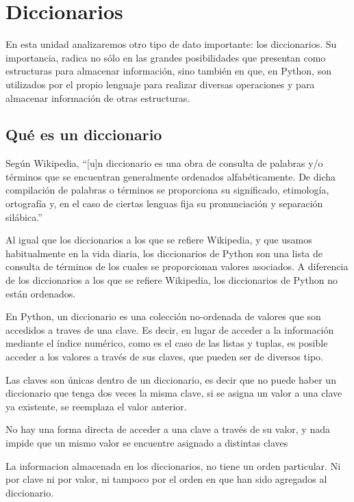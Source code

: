 \chapter{Diccionarios}

En esta unidad analizaremos otro tipo de dato importante: los diccionarios.
Su importancia, radica no sólo en las grandes posibilidades que presentan
como estructuras para almacenar información, sino también en que, en
Python, son utilizados por el propio lenguaje para realizar diversas
operaciones y para almacenar información de otras estructuras.

\section{Qué es un diccionario}

Según Wikipedia, ``[u]n diccionario es una obra de consulta de
palabras y/o términos que se encuentran generalmente ordenados
alfabéticamente. De dicha compilación de palabras o términos se
proporciona su significado, etimología, ortografía y, en el caso
de ciertas lenguas fija su pronunciación y separación silábica.''


Al igual que los diccionarios a los que se refiere Wikipedia, y
que usamos habitualmente en la vida diaria, los diccionarios de
Python son una lista de consulta de términos de los cuales se
proporcionan valores asociados. A diferencia de los diccionarios a
los que se refiere Wikipedia, los diccionarios de Python no están
ordenados.


En Python, un diccionario es una colección no-ordenada de valores
que son accedidos a traves de una clave.  Es decir, en lugar de
acceder a la información mediante el índice numérico, como es el
caso de las listas y tuplas, es posible acceder a los valores a
través de sus claves, que pueden ser de diversos tipo.


Las claves son únicas dentro de un diccionario, es decir que no puede haber
un diccionario que tenga dos veces la misma clave, si se asigna un valor a
una clave ya existente, se reemplaza el valor anterior.

No hay una forma directa de acceder a una clave a través de su valor, y
nada impide que un mismo valor se encuentre asignado a distintas claves

La informacion almacenada en los diccionarios, no tiene un orden
particular.  Ni por clave ni por valor, ni tampoco por el orden en
que han sido agregados al diccionario.

